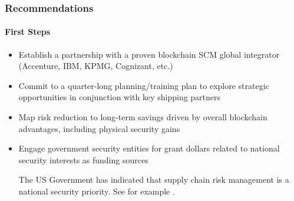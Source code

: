 \begin{frame}
  \frametitle{Recommendations}
  \framesubtitle{First Steps}
  \begin{itemize}
    \item<1-> Establish a partnership with a proven blockchain SCM global integrator (Accenture, IBM, KPMG, Cognizant, etc.)
    \item <2-> Commit to a quarter-long planning/training plan to explore strategic opportunities in conjunction with key shipping partners
    \item <3-> Map risk reduction to long-term savings driven by overall blockchain advantages, including physical security gains
    \item <4-> Engage government security entities for grant dollars related to national security interests as funding sources



           {\scriptsize{The US Government has indicated that supply chain risk management is a national security priority. See for example \parencite{cisaInformationCommunicationsTechnology2021}.}}

  \end{itemize}
\end{frame}
